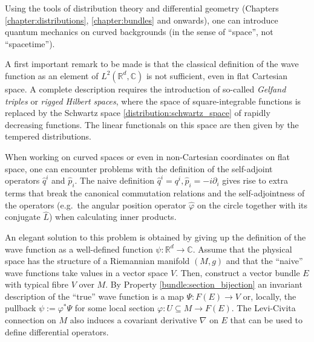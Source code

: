    Using the tools of distribution theory and differential geometry (Chapters \ref{chapter:distributions}, \ref{chapter:bundles} and onwards), one can introduce quantum mechanics on curved backgrounds (in the sense of ``space'', not ``spacetime'').

    \begin{remark}
        A first important remark to be made is that the classical definition of the wave function as an element of $L^2(\mathbb{R}^d,\mathbb{C})$ is not sufficient, even in flat Cartesian space. A complete description requires the introduction of so-called \textit{Gelfand triples} or \textit{rigged Hilbert spaces}, where the space of square-integrable functions is replaced by the Schwartz space \ref{distribution:schwartz_space} of rapidly decreasing functions. The linear functionals on this space are then given by the tempered distributions.
    \end{remark}

    When working on curved spaces or even in non-Cartesian coordinates on flat space, one can encounter problems with the definition of the self-adjoint operators $\hat{q}^i$ and $\hat{p}_i$. The naive definition $\hat{q}^i = q^i,\hat{p}_i = -i\partial_i$ gives rise to extra terms that break the canonical commutation relations and the self-adjointness of the operators (e.g.~the angular position operator $\hat{\varphi}$ on the circle together with its conjugate $\hat{L}$) when calculating inner products.

    An elegant solution to this problem is obtained by giving up the definition of the wave function as a well-defined function $\psi:\mathbb{R}^d\rightarrow\mathbb{C}$. Assume that the physical space has the structure of a Riemannian manifold $(M,g)$ and that the ``naive'' wave functions take values in a vector space $V$. Then, construct a vector bundle $E$ with typical fibre $V$ over $M$. By Property \ref{bundle:section_bijection} an invariant description of the ``true'' wave function is a map $\Psi:F(E)\rightarrow V$ or, locally, the pullback $\psi:=\varphi^*\Psi$ for some local section $\varphi:U\subseteq M\rightarrow F(E)$. The Levi-Civita connection on $M$ also induces a covariant derivative $\nabla$ on $E$ that can be used to define differential operators.

